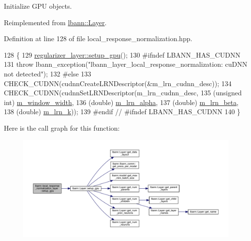 Initialize G\+PU objects. 



Reimplemented from \hyperlink{classlbann_1_1Layer_a36aa22ef90ce4de65abe729d38490863}{lbann\+::\+Layer}.



Definition at line 128 of file local\+\_\+response\+\_\+normalization.\+hpp.


\begin{DoxyCode}
128                             \{
129     \hyperlink{classlbann_1_1Layer_a36aa22ef90ce4de65abe729d38490863}{regularizer\_layer::setup\_gpu}();
130 \textcolor{preprocessor}{  #ifndef LBANN\_HAS\_CUDNN}
131     \textcolor{keywordflow}{throw} lbann\_exception(\textcolor{stringliteral}{"lbann\_layer\_local\_response\_normalization: cuDNN not detected"});
132 \textcolor{preprocessor}{  #else}
133     CHECK\_CUDNN(cudnnCreateLRNDescriptor(&m\_lrn\_cudnn\_desc));
134     CHECK\_CUDNN(cudnnSetLRNDescriptor(m\_lrn\_cudnn\_desc,
135                                       (\textcolor{keywordtype}{unsigned} \textcolor{keywordtype}{int}) \hyperlink{classlbann_1_1local__response__normalization__layer_a4914619a19eb43efcf8240b8a1e0c090}{m\_window\_width},
136                                       (\textcolor{keywordtype}{double}) \hyperlink{classlbann_1_1local__response__normalization__layer_a85c25a68888e2e9d163a820326fc09ff}{m\_lrn\_alpha},
137                                       (\textcolor{keywordtype}{double}) \hyperlink{classlbann_1_1local__response__normalization__layer_ad06848e9d59664be86aecbc1e2ba556f}{m\_lrn\_beta},
138                                       (\textcolor{keywordtype}{double}) \hyperlink{classlbann_1_1local__response__normalization__layer_a896f875d6f6a763c1cb0dbd43679164e}{m\_lrn\_k}));
139 \textcolor{preprocessor}{  #endif // #ifndef LBANN\_HAS\_CUDNN}
140   \}
\end{DoxyCode}
Here is the call graph for this function\+:\nopagebreak
\begin{figure}[H]
\begin{center}
\leavevmode
\includegraphics[width=350pt]{classlbann_1_1local__response__normalization__layer_aff5210d74db5f8302989cca12d04263d_cgraph}
\end{center}
\end{figure}


